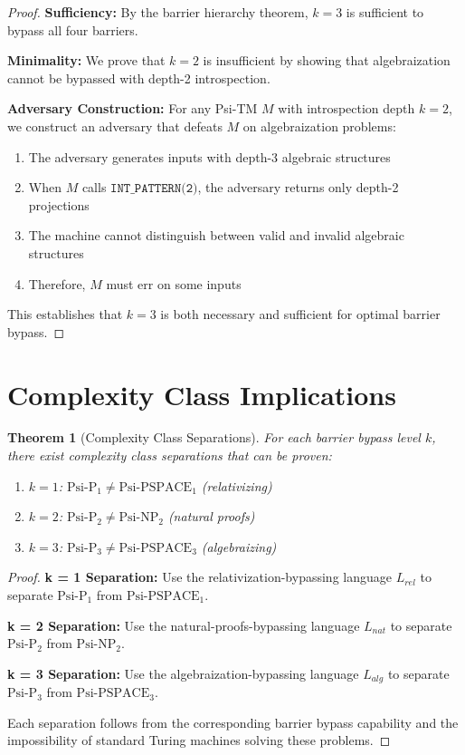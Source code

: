 \documentclass[11pt]{article}
\newtheorem{theorem}{Theorem}
\begin{document}
\begin{proof}
\textbf{Sufficiency:}
By the barrier hierarchy theorem, $k = 3$ is sufficient to bypass all four barriers.

\textbf{Minimality:}
We prove that $k = 2$ is insufficient by showing that algebraization cannot be bypassed with depth-2 introspection.

\textbf{Adversary Construction:}
For any Psi-TM $M$ with introspection depth $k = 2$, we construct an adversary that defeats $M$ on algebraization problems:

\begin{enumerate}
\item The adversary generates inputs with depth-3 algebraic structures
\item When $M$ calls $\texttt{INT\_PATTERN(2)}$, the adversary returns only depth-2 projections
\item The machine cannot distinguish between valid and invalid algebraic structures
\item Therefore, $M$ must err on some inputs
\end{enumerate}

This establishes that $k = 3$ is both necessary and sufficient for optimal barrier bypass.
\end{proof}

\section{Complexity Class Implications}

\begin{theorem}[Complexity Class Separations]
For each barrier bypass level $k$, there exist complexity class separations that can be proven:
\begin{enumerate}
\item $k = 1$: $\text{Psi-P}_1 \neq \text{Psi-PSPACE}_1$ (relativizing)
\item $k = 2$: $\text{Psi-P}_2 \neq \text{Psi-NP}_2$ (natural proofs)
\item $k = 3$: $\text{Psi-P}_3 \neq \text{Psi-PSPACE}_3$ (algebraizing)
\end{enumerate}
\end{theorem}

\begin{proof}
\textbf{k = 1 Separation:}
Use the relativization-bypassing language $L_{rel}$ to separate $\text{Psi-P}_1$ from $\text{Psi-PSPACE}_1$.

\textbf{k = 2 Separation:}
Use the natural-proofs-bypassing language $L_{nat}$ to separate $\text{Psi-P}_2$ from $\text{Psi-NP}_2$.

\textbf{k = 3 Separation:}
Use the algebraization-bypassing language $L_{alg}$ to separate $\text{Psi-P}_3$ from $\text{Psi-PSPACE}_3$.

Each separation follows from the corresponding barrier bypass capability and the impossibility of standard Turing machines solving these problems.
\end{proof}
\end{document}
